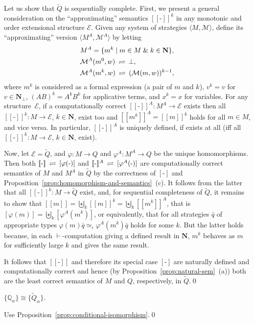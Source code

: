 \documentclass[fleqn]{LMCS}
\theoremstyle{plain}\newtheorem{satz}[thm]{Satz}
\theoremstyle{plain}\newtheorem{hyp}[thm]{Hypothesis}
\theoremstyle{plain}\newtheorem{hyps}[thm]{Hypotheses}
\theoremstyle{definition}\newtheorem{note}[thm]{Note}
\newcommand{\EE}{\mathcal{E}}
\newcommand{\defis}{\mbox{-}}
\newcommand{\setof}[1]{\{#1\}}
\newcommand{\bYdef}{\mathrel{\BYDEF}}
\newcommand{\BYDEF}{\mbox{$\hspace{.2em}\rightleftharpoons\hspace{.2em}$}}
\newcommand{\pointwiselub}{\biguplus}
\newcommand{\arr}{\rightarrow}
\newcommand{\la}{\langle}
\newcommand{\ra}{\rangle}
\newcommand{\Dsem}[1]{[\![ #1 ]\!]}
\newcommand{\tuple}[1]{\la #1 \ra}
\newcommand{\AND}{\mathrel{\&}}
\newcommand{\NN}{\mathbf{N}}
\newcommand{\bbQ}{\mathbb{Q}}
\newcommand{\Undef}{{\perp}}
\newcommand{\MM}{{\mathcal M}}
\newcommand{\bq}{\bar{q}}
\newcommand{\tQ}{\tilde{Q}}
\newcommand{\?}{\mbox{?}}
\begin{document}
\begin{enumerate}[(a)]
Let us show 
that $\tQ$ is sequentially complete.
First, we present a general consideration on the ``approximating'' semantics $\Dsem{\defis}^k$ 
in any monotonic and order extensional structure $\EE$. 
Given any system of strategies $\tuple{M,\MM}$, define its 
``approximating'' 
version $\tuple{M^{A},\MM^{A}}$ by letting 
\begin{align*}
&M^{A}=\setof{m^k\mid m\in M\AND k\in\NN}, 
\\
&\MM^{A}(m^0,w)\bYdef\Undef,
\\
&\MM^{A}(m^k,w)\bYdef(\MM(m,w))^{k-1},
\end{align*}
where $m^k$ is considered as a formal expression (a pair of $m$ and $k$), 
$v^k = v$ for $v\in\NN_\Undef$, $(AB)^k=A^k B^k$ for applicative terms, 
and $x^k=x$ for variables. 
For any structure~$\EE$, if a computationally correct 
$\Dsem{\defis}^{A}:M^{A}\arr\EE$ exists 
then all $\Dsem{\defis}^k:M\arr\EE$, $k\in\NN$, exist too and 
$\Dsem{m^k}^{A}=\Dsem{m}^k$ holds for all $m\in M$, and vice versa. 
In particular, $\Dsem{\defis}^{A}$ is uniquely defined, if exists at all 
(iff all $\Dsem{\defis}^k:M\arr\EE$, $k\in\NN$, exist). 


Now, let $\EE=\tQ$, and 
$\varphi:M\arr Q$ and $\varphi^{A}:M^{A}\arr Q$ be the unique homomorphisms. 
Then both $\Dsem{\defis}\bYdef[\varphi(\defis)]$ and 
$\Dsem{\defis}^{A}\bYdef[\varphi^{A}(\defis)]$ 
are computationally correct semantics of $M$ and $M^{A}$ in $\tQ$ 
by the correctness of $[\defis]$ 
and Proposition~\ref{prop:homomorphism-and-semantics}~(c). 
It follows from the latter that all $\Dsem{\defis}^k:M\arr\tQ$ exist, and, for 
sequential completeness of  $\tQ$, it remains to show that 
$\Dsem{m}=\pointwiselub_k\Dsem{m}^k=\pointwiselub_k\Dsem{m^k}^{A}$, that is 
$[\varphi(m)]=\pointwiselub_k[\varphi^{A}(m^k)]$, or equivalently, that 
for all strategies $\bq$ of appropriate types
$\varphi(m)\bq\simeq_\iota\varphi^{A}(m^k)\bq$ holds for some $k$. 
But the latter holds because, in each $\vdash$-computation 
giving a defined result in $\NN$, 
$m^k$ behaves as $m$ for sufficiently large $k$ and gives the same result. 


It follows that $\Dsem{\defis}$ and therefore its special case 
$[\defis]$ are naturally defined and computationally correct and hence (by 
Proposition~\ref{prop:natural-sem}~(a))
both are the least correct semantics of $M$ and $Q$, respectively, in $\tQ$.\qed
\end{enumerate}



\begin{cor}\label{corr:isomorphism}
$\setof{\bbQ_\alpha}\cong\setof{\tQ_\alpha}$.
\end{cor}
\proof 
Use Proposition~\ref{prop:conditional-isomorphism}.\qed
\end{document}
